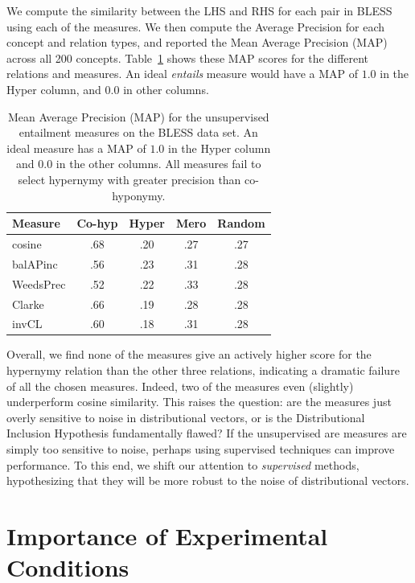 We compute the similarity between the LHS and RHS for each pair in BLESS using
each of the measures.  We then compute the Average Precision for each concept
and relation types, and reported the Mean Average Precision (MAP) across all
200 concepts.  Table~\ref{tab:mapscores1} shows these MAP scores for the
different relations and measures. An ideal {\em entails} measure would have a
MAP of $1.0$ in the Hyper column, and $0.0$ in other columns.

\begin{table}
  \centering
  \begin{small}
  \begin{tabular}{|l|cccc|}
    \hline
    Measure        & Co-hyp  & Hyper  & Mero  & Random  \\
    \hline
    cosine         &   .68   &   .20  &  .27  &    .27  \\
    balAPinc       &   .56   &   .23  &  .31  &    .28  \\
    WeedsPrec      &   .52   &   .22  &  .33  &    .28  \\
    Clarke         &   .66   &   .19  &  .28  &    .28  \\
    invCL          &   .60   &   .18  &  .31  &    .28  \\
    \hline
  \end{tabular}
  \end{small}
  \caption{Mean Average Precision (MAP)  for the unsupervised entailment
    measures on the BLESS data set. An ideal measure has a MAP of $1.0$ in the
    Hyper column and $0.0$ in the other columns. All measures fail to select
    hypernymy with greater precision than co-hyponymy.}
  \label{tab:mapscores1}
\end{table}

Overall, we find none of the measures give an actively higher score for the
hypernymy relation than the other three relations, indicating a dramatic
failure of all the chosen measures. Indeed, two of the measures even (slightly)
underperform cosine similarity. This raises the question: are the measures
just overly sensitive to noise in distributional vectors, or is the
Distributional Inclusion Hypothesis fundamentally flawed? If the unsupervised
are measures are simply too sensitive to noise, perhaps using supervised
techniques can improve performance. To this end, we shift our attention to
{\em supervised} methods, hypothesizing that they will be more robust to
the noise of distributional vectors.

\section{Importance of Experimental Conditions}

